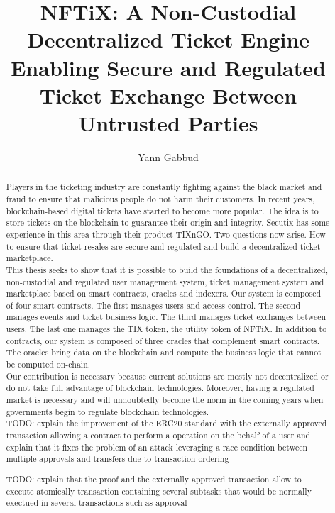 \documentclass[a4paper,11pt,oneside]{report}
\title{NFTiX: A Non-Custodial Decentralized Ticket Engine Enabling Secure and Regulated Ticket Exchange Between Untrusted Parties}
\author{Yann Gabbud}
\affiliation{Distributed Computing Laboratory \\
and \\
Secutix SA, an ELCA company \\}
\begin{document}
\maketitle
\makeacks

\begin{abstract}
Players in the ticketing industry are constantly fighting against the black market and fraud to ensure that malicious people do not harm their customers. In recent years, blockchain-based digital tickets have started to become more popular. The idea is to store tickets on the blockchain to guarantee their origin and integrity. Secutix has some experience in this area through their product TIXnGO. Two questions now arise. How to ensure that ticket resales are secure and regulated and build a decentralized ticket marketplace. \\

This thesis seeks to show that it is possible to build the foundations of a decentralized, non-custodial and regulated user management system, ticket management system and marketplace based on smart contracts, oracles and indexers. Our system is composed of four smart contracts. The first manages users and access control. The second manages events and ticket business logic. The third manages ticket exchanges between users. The last one manages the TIX token, the utility token of NFTiX. In addition to contracts, our system is composed of three oracles that complement smart contracts. The oracles bring data on the blockchain and compute the business logic that cannot be computed on-chain. \\

Our contribution is necessary because current solutions are mostly not decentralized or do not take full advantage of blockchain technologies. Moreover, having a regulated market is necessary and will undoubtedly become the norm in the coming years when governments begin to regulate blockchain technologies. \\

TODO: explain the improvement of the ERC20 standard with the externally approved transaction allowing a contract to perform a operation on the behalf of a user and explain that it fixes the problem of an attack leveraging a race condition between multiple approvals and transfers due to transaction ordering 

TODO: explain that the proof and the externally approved transaction allow to execute atomically transaction containing several subtasks that would be normally exectued in several transactions such as approval

\end{abstract}
\end{document}
